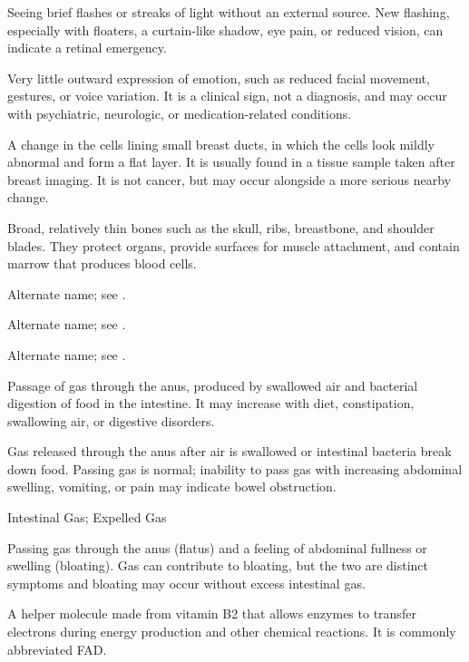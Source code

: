  Seeing brief flashes or streaks of light without an external source. New flashing, especially with floaters, a curtain-like shadow, eye pain, or reduced vision, can indicate a retinal emergency.

 Very little outward expression of emotion, such as reduced facial movement, gestures, or voice variation. It is a clinical sign, not a diagnosis, and may occur with psychiatric, neurologic, or medication-related conditions.

 A change in the cells lining small
  breast ducts, in which the cells look mildly abnormal and form a flat
  layer. It is usually found in a tissue sample taken after breast
  imaging. It is not cancer, but may occur alongside a more serious
  nearby change.

 Broad, relatively thin bones such as the skull, ribs, breastbone, and shoulder blades. They protect organs, provide surfaces for muscle attachment, and contain marrow that produces blood cells.

 Alternate name; see .

 Alternate name; see .

 Alternate name; see .

 Passage of gas through the anus, produced by swallowed air and bacterial digestion of food in the intestine. It may increase with diet, constipation, swallowing air, or digestive disorders.

 Gas released through the anus after air is swallowed or intestinal bacteria break down food. Passing gas is normal; inability to pass gas with increasing abdominal swelling, vomiting, or pain may indicate bowel obstruction.

\synonyms
Intestinal Gas; Expelled Gas

 Passing gas through the anus (flatus) and a feeling of abdominal fullness or swelling (bloating). Gas can contribute to bloating, but the two are distinct symptoms and bloating may occur without excess intestinal gas.

 A helper molecule made from vitamin B2 that allows enzymes to transfer electrons during energy production and other chemical reactions. It is commonly abbreviated FAD.


